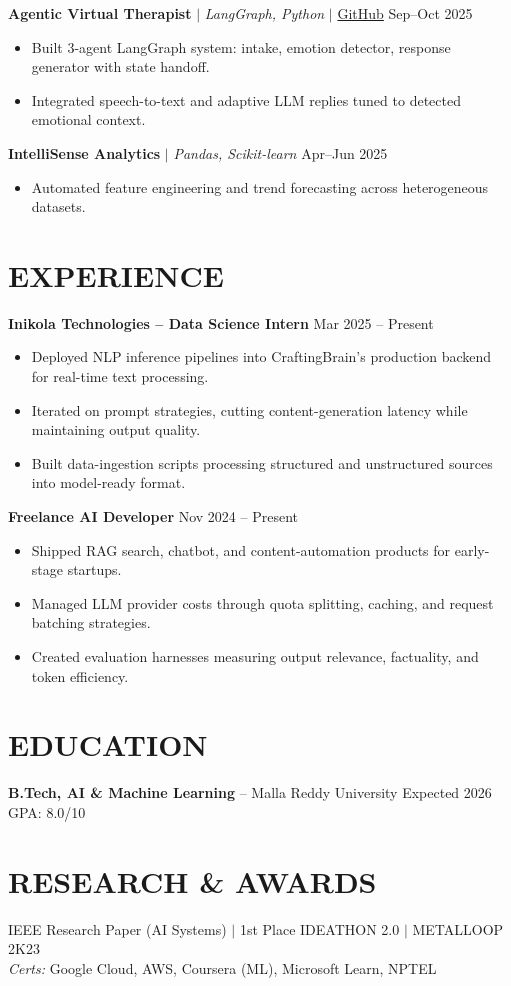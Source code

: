 \documentclass[10pt]{article}
\begin{document}
\textbf{Agentic Virtual Therapist} $|$ \textit{LangGraph, Python} $|$ \href{https://github.com/JeetInTech/Virtual-Therapist---LangGraph-Agentic-AI-System}{GitHub} \hfill Sep--Oct 2025
\begin{itemize}
\item Built 3-agent LangGraph system: intake, emotion detector, response generator with state handoff.
\item Integrated speech-to-text and adaptive LLM replies tuned to detected emotional context.
\end{itemize}

\textbf{IntelliSense Analytics} $|$ \textit{Pandas, Scikit-learn} \hfill Apr--Jun 2025
\begin{itemize}
\item Automated feature engineering and trend forecasting across heterogeneous datasets.
\end{itemize}

\section*{EXPERIENCE}
\textbf{Inikola Technologies -- Data Science Intern} \hfill Mar 2025 -- Present
\begin{itemize}
\item Deployed NLP inference pipelines into CraftingBrain's production backend for real-time text processing.
\item Iterated on prompt strategies, cutting content-generation latency while maintaining output quality.
\item Built data-ingestion scripts processing structured and unstructured sources into model-ready format.
\end{itemize}

\textbf{Freelance AI Developer} \hfill Nov 2024 -- Present
\begin{itemize}
\item Shipped RAG search, chatbot, and content-automation products for early-stage startups.
\item Managed LLM provider costs through quota splitting, caching, and request batching strategies.
\item Created evaluation harnesses measuring output relevance, factuality, and token efficiency.
\end{itemize}

\section*{EDUCATION}
\textbf{B.Tech, AI \& Machine Learning} -- Malla Reddy University \hfill Expected 2026 \hfill GPA: 8.0/10

\section*{RESEARCH \& AWARDS}
IEEE Research Paper (AI Systems) $|$ 1st Place IDEATHON 2.0 $|$ METALLOOP 2K23 \\
\textit{Certs:} Google Cloud, AWS, Coursera (ML), Microsoft Learn, NPTEL
\end{document}

